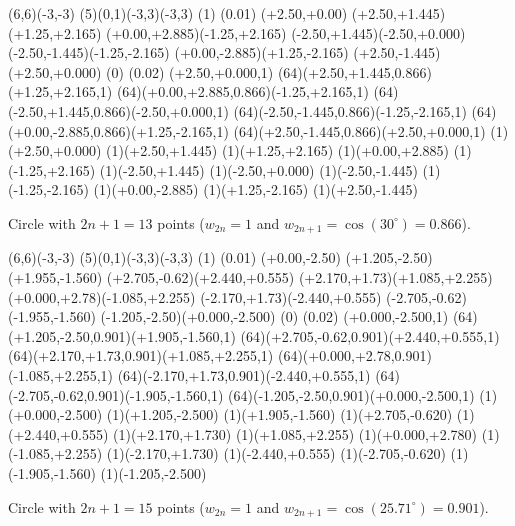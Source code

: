 \begin{center}

\begin{lapdf}(6,6)(-3,-3)
 \Lingrid(5)(0,1)(-3,3)(-3,3)
 \Dash(1)
 \Setwidth(0.01)
 \Polygon(+2.50,+0.00)
 (+2.50,+1.445)(+1.25,+2.165)
 (+0.00,+2.885)(-1.25,+2.165)
 (-2.50,+1.445)(-2.50,+0.000)
 (-2.50,-1.445)(-1.25,-2.165)
 (+0.00,-2.885)(+1.25,-2.165)
 (+2.50,-1.445)(+2.50,+0.000) \Stroke
 \Dash(0)
 \Setwidth(0.02)
 \Red
 \Rmoveto(+2.50,+0.000,1)
 \Rcurveto(64)(+2.50,+1.445,0.866)(+1.25,+2.165,1)
 \Rcurveto(64)(+0.00,+2.885,0.866)(-1.25,+2.165,1)
 \Rcurveto(64)(-2.50,+1.445,0.866)(-2.50,+0.000,1)
 \Rcurveto(64)(-2.50,-1.445,0.866)(-1.25,-2.165,1)
 \Rcurveto(64)(+0.00,-2.885,0.866)(+1.25,-2.165,1)
 \Rcurveto(64)(+2.50,-1.445,0.866)(+2.50,+0.000,1) \Stroke
 \Black
 \Point(1)(+2.50,+0.000)
 \Point(1)(+2.50,+1.445)
 \Point(1)(+1.25,+2.165)
 \Point(1)(+0.00,+2.885)
 \Point(1)(-1.25,+2.165)
 \Point(1)(-2.50,+1.445)
 \Point(1)(-2.50,+0.000)
 \Point(1)(-2.50,-1.445)
 \Point(1)(-1.25,-2.165)
 \Point(1)(+0.00,-2.885)
 \Point(1)(+1.25,-2.165)
 \Point(1)(+2.50,-1.445)
\end{lapdf}

Circle with $2n+1=13$ points ($w_{2n}=1$ and $w_{2n+1} = \cos(30^\circ) = 0.866$).
\end{center}

\begin{center}

\begin{lapdf}(6,6)(-3,-3)
 \Lingrid(5)(0,1)(-3,3)(-3,3)
 \Dash(1)
 \Setwidth(0.01)
 \Polygon(+0.00,-2.50)
 (+1.205,-2.50)(+1.955,-1.560)
 (+2.705,-0.62)(+2.440,+0.555)
 (+2.170,+1.73)(+1.085,+2.255)
 (+0.000,+2.78)(-1.085,+2.255)
 (-2.170,+1.73)(-2.440,+0.555)
 (-2.705,-0.62)(-1.955,-1.560)
 (-1.205,-2.50)(+0.000,-2.500) \Stroke
 \Dash(0)
 \Setwidth(0.02)
 \Red
 \Rmoveto(+0.000,-2.500,1)
 \Rcurveto(64)(+1.205,-2.50,0.901)(+1.905,-1.560,1)
 \Rcurveto(64)(+2.705,-0.62,0.901)(+2.440,+0.555,1)
 \Rcurveto(64)(+2.170,+1.73,0.901)(+1.085,+2.255,1)
 \Rcurveto(64)(+0.000,+2.78,0.901)(-1.085,+2.255,1)
 \Rcurveto(64)(-2.170,+1.73,0.901)(-2.440,+0.555,1)
 \Rcurveto(64)(-2.705,-0.62,0.901)(-1.905,-1.560,1)
 \Rcurveto(64)(-1.205,-2.50,0.901)(+0.000,-2.500,1) \Stroke
 \Black
 \Point(1)(+0.000,-2.500)
 \Point(1)(+1.205,-2.500)
 \Point(1)(+1.905,-1.560)
 \Point(1)(+2.705,-0.620)
 \Point(1)(+2.440,+0.555)
 \Point(1)(+2.170,+1.730)
 \Point(1)(+1.085,+2.255)
 \Point(1)(+0.000,+2.780)
 \Point(1)(-1.085,+2.255)
 \Point(1)(-2.170,+1.730)
 \Point(1)(-2.440,+0.555)
 \Point(1)(-2.705,-0.620)
 \Point(1)(-1.905,-1.560)
 \Point(1)(-1.205,-2.500)
\end{lapdf}

Circle with $2n+1=15$ points ($w_{2n}=1$ and $w_{2n+1} = \cos(25.71^\circ) = 0.901$).
\end{center}

